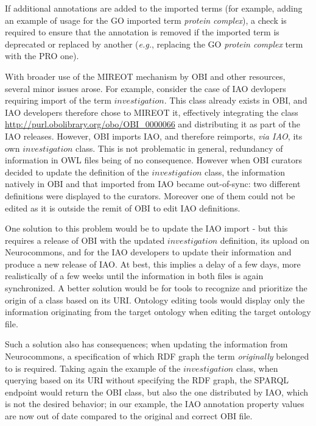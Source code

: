 \documentclass{ao2e}%
\begin{document}
If additional annotations are added to the imported terms (for example, adding an example of usage for the \ac{GO} imported term \textit{protein complex}), a check is required to ensure that the annotation is removed if the imported term is deprecated or replaced by another (\emph{e.g.}, replacing  the \ac{GO} \textit{protein complex} term with the \ac{PRO} \cite{PRO} one).

With broader use of the MIREOT mechanism by OBI and other resources, several minor issues arose.
For example, consider the case of \ac{IAO} devlopers requiring import of the term $investigation$.  This class already exists in \ac{OBI}, and \ac{IAO} developers therefore chose to MIREOT it, effectively integrating the class \url{http://purl.obolibrary.org/obo/OBI_0000066} and distributing it as part of the \ac{IAO} releases.
However, \ac{OBI} imports \ac{IAO}, and therefore reimports, \emph{via IAO}, its own $investigation$ class. This is not problematic in general, redundancy of information in OWL files being of no consequence. However when \ac{OBI} curators decided to update the definition of the $investigation$ class, the information natively in \ac{OBI} and that imported from \ac{IAO} became out-of-sync: two different definitions were displayed to the curators. Moreover one of them could not be edited as it is outside the remit of OBI to edit IAO definitions.

One solution to this problem would be to update the \ac{IAO} import - but this requires a release of \ac{OBI} with the updated $investigation$ definition, its upload on Neurocommons, and for the \ac{IAO} developers to update their information and produce a new release of \ac{IAO}. At best, this implies a delay of a few days, more realistically of a few weeks until the information in both files is again synchronized.
A better solution would be for tools to recognize and prioritize the origin of a class based on its URI. Ontology editing tools would display only the information originating from the target ontology when editing the target ontology file.

Such a solution also has consequences; when updating the information from Neurocommons, a specification of which \ac{RDF} graph \cite{RDF} the term \emph{originally} belonged to is required. Taking again the example of the $investigation$ class, when querying based on its URI without specifying the RDF graph, the SPARQL endpoint would return the \ac{OBI} class, but also the one distributed by \ac{IAO}, which is not the desired behavior; in our example, the \ac{IAO} annotation property values are now out of date compared to the original and correct \ac{OBI} file.
\end{document}
